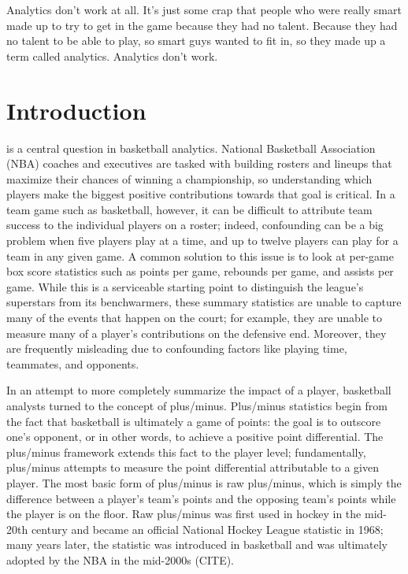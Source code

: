 
\begin{savequote}[75mm]
    Analytics don't work at all. It's just some crap that people who were really
    smart made up to try to get in the game because they had no talent. Because they
    had no talent to be able to play, so smart guys wanted to fit in, so they made
    up a term called analytics. Analytics don't work.

\end{savequote}
\chapter{Introduction} \label{ch:intro}

 is
a central question in basketball analytics. National Basketball Association (NBA)
coaches and executives are tasked with building rosters and lineups that maximize
their chances of winning a championship, so understanding which players make the
biggest positive contributions towards that goal is critical. In a team game such as
basketball, however, it can be difficult to attribute team success to the individual
players on a roster; indeed, confounding can be a big problem when five players play
at a time, and up to twelve players can play for a team in any given game. A common
solution to this issue is to look at per-game box score statistics such as points
per game, rebounds per game, and assists per game. While this is a serviceable
starting point to distinguish the league's superstars from its benchwarmers, these
summary statistics are unable to capture many of the events that happen on the
court; for example, they are unable to measure many of a player's contributions on
the defensive end. Moreover, they are frequently misleading due to confounding
factors like playing time, teammates, and opponents.

In an attempt to more completely summarize the impact of a player, basketball
analysts turned to the concept of plus/minus. Plus/minus statistics begin from the
fact that basketball is ultimately a game of points: the goal is to outscore one's
opponent, or in other words, to achieve a positive point differential. The
plus/minus framework extends this fact to the player level; fundamentally,
plus/minus attempts to measure the point differential attributable to a given
player. The most basic form of plus/minus is raw plus/minus, which is simply the
difference between a player's team's points and the opposing team's points while the
player is on the floor. Raw plus/minus was first used in hockey in the mid-20th
century and became an official National Hockey League statistic in 1968; many years
later, the statistic was introduced in basketball and was ultimately adopted by the
NBA in the mid-2000s (CITE).

